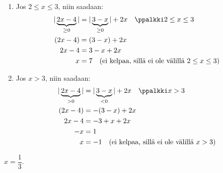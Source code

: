 \begin{esimerkki}
\begin{esimratk}
\begin{enumerate}[(1.)]
			\item Jos $2\leq x\leq 3$, niin saadaan:
				\begin{align*}
					|\underbrace{2x-4}_{\geq0}|&=|\underbrace{3-x}_{\geq0}|+2x \quad \ppalkki 2\leq x\leq 3  \\
					(2x-4)&=(3-x)+2x \\
					2x-4&=3-x+2x \\
					x &= 7 \quad \text{(ei kelpaa, sillä ei ole välillä $2\leq x\leq 3$)}
				\end{align*}

			\item Jos $x>3$, niin saadaan:
				\begin{align*}
					|\underbrace{2x-4}_{>0}|&=|\underbrace{3-x}_{<0}|+2x \quad \ppalkki x>3  \\
					(2x-4)&=-(3-x)+2x \\
					2x-4&=-3+x+2x \\
					-x &= 1 \\
					x &= -1  \quad \text{(ei kelpaa, sillä ei ole välillä $x>3$)}
				\end{align*}
		\end{enumerate}
	\end{esimratk}
	\begin{esimvast}
		\quad $x=\dfrac{1}{3}$.
	\end{esimvast}
\end{esimerkki}

